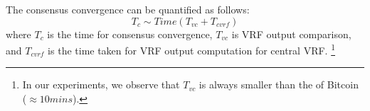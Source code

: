 \begin{table}[!htb]
\caption{Notations used in Algorithm \ref{alg:vrf}}
    \label{tab:notations_vrf_algorithm}
    \centering
\end{table}

The consensus convergence can be quantified as follows:
$$T_{c} \sim Time(T_{vc} + T_{cvrf})$$
where $T_c$ is the time for consensus convergence, 
$T_{vc}$ is VRF output comparison, and $T_{cvrf}$ is the time taken for VRF output computation for
central VRF.
\footnote{
In our experiments, we observe that $T_{vc}$ is always smaller than the of Bitcoin ($\approx 10 mins$).}
